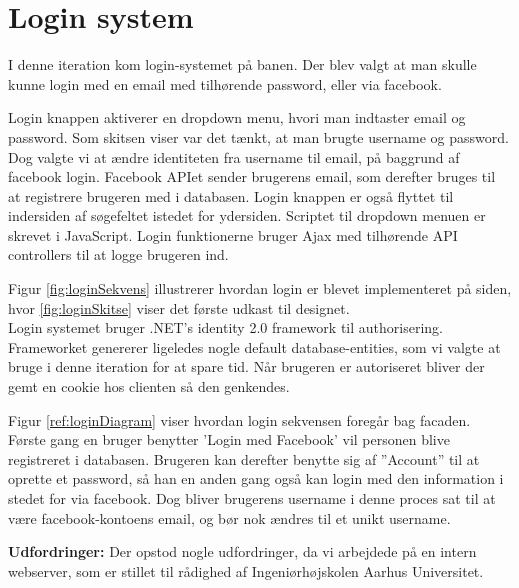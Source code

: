 \section{Login system}

I denne iteration kom login-systemet på banen. Der blev valgt at man skulle kunne login med en email med tilhørende password, eller via facebook.


Login knappen aktiverer en dropdown menu, hvori man indtaster email og password. Som skitsen viser var det tænkt, at man brugte username og password. Dog valgte vi at ændre identiteten fra username til email, på baggrund af facebook login. Facebook APIet sender brugerens email, som derefter bruges til at registrere brugeren med i databasen. Login knappen er også flyttet til indersiden af søgefeltet istedet for ydersiden. Scriptet til dropdown menuen er skrevet i JavaScript. Login funktionerne bruger Ajax med tilhørende API controllers til at logge brugeren ind.


Figur \ref{fig:loginSekvens} illustrerer hvordan login er blevet implementeret på siden, hvor \ref{fig:loginSkitse} viser det første udkast til designet. \\

Login systemet bruger .NET's identity 2.0 framework til authorisering. Frameworket genererer ligeledes nogle default database-entities, som vi valgte at bruge i denne iteration for at spare tid. Når brugeren er autoriseret bliver der gemt en cookie hos clienten så den genkendes.



Figur \ref{ref:loginDiagram} viser hvordan login sekvensen foregår bag facaden. Første gang en bruger benytter 'Login med Facebook' vil personen blive registreret i databasen. Brugeren kan derefter benytte sig af ''Account'' til at oprette et password, så han en anden gang også kan login med den information i stedet for via facebook. Dog bliver brugerens username i denne proces sat til at være facebook-kontoens email, og bør nok ændres til et unikt username.

\textbf{Udfordringer:} 
Der opstod nogle udfordringer, da vi arbejdede på en intern webserver, som er stillet til rådighed af Ingeniørhøjskolen Aarhus Universitet. 

